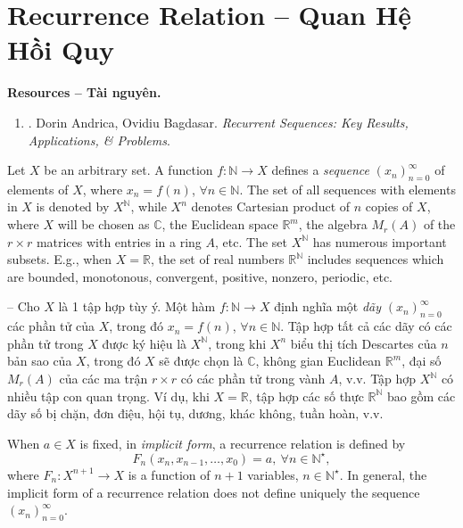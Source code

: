 \documentclass{article}
\begin{document}

\section{Recurrence Relation -- Quan Hệ Hồi Quy}
\textbf{\textsf{Resources -- Tài nguyên.}}
\begin{enumerate}
	\item \cite{Andrica_Bagdasar2020}. {\sc Dorin Andrica, Ovidiu Bagdasar}. {\it Recurrent Sequences: Key Results, Applications, \& Problems}.
\end{enumerate}
Let $X$ be an arbitrary set. A function $f:\mathbb{N}\to X$ defines a {\it sequence} $(x_n)_{n=0}^\infty$ of elements of $X$, where $x_n = f(n)$, $\forall n\in\mathbb{N}$. The set of all sequences with elements in $X$ is denoted by $X^\mathbb{N}$, while $X^n$ denotes Cartesian product of $n$ copies of $X$, where $X$ will be chosen as $\mathbb{C}$, the Euclidean space $\mathbb{R}^m$, the algebra $M_r(A)$ of the $r\times r$ matrices with entries in a ring $A$, etc. The set $X^\mathbb{N}$ has numerous important subsets. E.g., when $X = \mathbb{R}$, the set of real numbers $\mathbb{R}^\mathbb{N}$ includes sequences which are bounded, monotonous, convergent, positive, nonzero, periodic, etc.

-- Cho $X$ là 1 tập hợp tùy ý. Một hàm $f:\mathbb{N}\to X$ định nghĩa một {\it dãy} $(x_n)_{n=0}^\infty$ các phần tử của $X$, trong đó $x_n = f(n)$, $\forall n\in\mathbb{N}$. Tập hợp tất cả các dãy có các phần tử trong $X$ được ký hiệu là $X^\mathbb{N}$, trong khi $X^n$ biểu thị tích Descartes của $n$ bản sao của $X$, trong đó $X$ sẽ được chọn là $\mathbb{C}$, không gian Euclidean $\mathbb{R}^m$, đại số $M_r(A)$ của các ma trận $r\times r$ có các phần tử trong vành $A$, v.v. Tập hợp $X^\mathbb{N}$ có nhiều tập con quan trọng. Ví dụ, khi $X = \mathbb{R}$, tập hợp các số thực $\mathbb{R}^\mathbb{N}$ bao gồm các dãy số bị chặn, đơn điệu, hội tụ, dương, khác không, tuần hoàn, v.v.

When $a\in X$ is fixed, in {\it implicit form}, a recurrence relation is defined by
\begin{equation}
	\label{recurrence relation: implicit form}
	F_n(x_n,x_{n-1},\ldots,x_0) = a,\ \forall n\in\mathbb{N}^\star,
\end{equation}
where $F_n:X^{n+1}\to X$ is a function of $n + 1$ variables, $n\in\mathbb{N}^\star$. In general, the implicit form of a recurrence relation does not define uniquely the sequence $(x_n)_{n=0}^\infty$.
\end{document}
